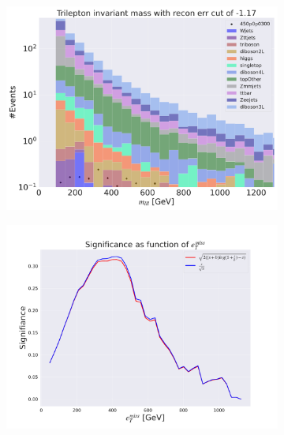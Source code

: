 \begin{figure}[H]
\begin{subfigure}{.40\textwidth}
        \caption{}
        \label{fig:AE_3lep_big_etmiss_450_2}
    \end{subfigure}
    \hfill
    \begin{subfigure}{.40\textwidth}
        \includegraphics[width=\textwidth]{Figures/AE_testing/big/3lep/b_data_recon_big_rm3_feats_sig_450p0p0300_mlll_recon_errcut_-1.17.pdf}
        \caption{}
        \label{fig:AE_3lep_big_mlll_450_2}
    \end{subfigure}
    \hfill   
    \begin{subfigure}{.40\textwidth}
        \includegraphics[width=\textwidth]{Figures/AE_testing/big/3lep/significance_etmiss_450p0p0300_-1.1736206563802147.pdf}
        \caption{}
        \label{fig:AE_3lep_big_signi_450_2}

\end{subfigure}
\end{figure}
